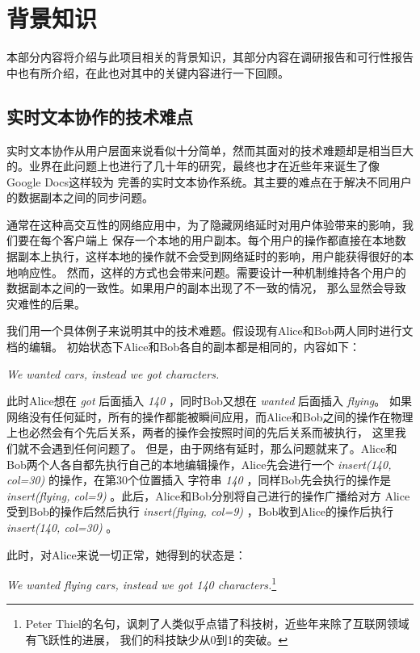 \documentclass[11pt]{ctexart}
\begin{document}
\section{背景知识}
本部分内容将介绍与此项目相关的背景知识，其部分内容在调研报告和可行性报告中也有所介绍，在此也对其中的关键内容进行一下回顾。
\subsection{实时文本协作的技术难点}
实时文本协作从用户层面来说看似十分简单，然而其面对的技术难题却是相当巨大的。业界在此问题上也进行了几十年的研究，最终也才在近些年来诞生了像Google Docs这样较为
完善的实时文本协作系统。其主要的难点在于解决不同用户的数据副本之间的同步问题。  

通常在这种高交互性的网络应用中，为了隐藏网络延时对用户体验带来的影响，我们要在每个客户端上
保存一个本地的用户副本。每个用户的操作都直接在本地数据副本上执行，这样本地的操作就不会受到网络延时的影响，用户能获得很好的本地响应性。
然而，这样的方式也会带来问题。需要设计一种机制维持各个用户的数据副本之间的一致性。如果用户的副本出现了不一致的情况，
那么显然会导致灾难性的后果。

我们用一个具体例子来说明其中的技术难题。假设现有Alice和Bob两人同时进行文档的编辑。
初始状态下Alice和Bob各自的副本都是相同的，内容如下：
\begin{center}
\textit{We wanted cars, instead we got characters.}
\end{center}

此时Alice想在 \textit{got} 后面插入 \textit{140} ，同时Bob又想在 \textit{wanted} 后面插入 \textit{flying}。
如果网络没有任何延时，所有的操作都能被瞬间应用，而Alice和Bob之间的操作在物理上也必然会有个先后关系，两者的操作会按照时间的先后关系而被执行，
这里我们就不会遇到任何问题了。
但是，由于网络有延时，那么问题就来了。Alice和Bob两个人各自都先执行自己的本地编辑操作，Alice先会进行一个 \textit{insert(140, col=30)} 的操作，在第30个位置插入
字符串 \textit{140} ，同样Bob先会执行的操作是 \textit{insert(flying, col=9)} 。此后，Alice和Bob分别将自己进行的操作广播给对方
Alice受到Bob的操作后然后执行 \textit{insert(flying, col=9)} ，Bob收到Alice的操作后执行 \textit{insert(140, col=30)} 。

此时，对Alice来说一切正常，她得到的状态是：
\begin{center}
    \textit{We wanted flying cars, instead we got 140 characters.}\footnote{Peter Thiel的名句，讽刺了人类似乎点错了科技树，近些年来除了互联网领域有飞跃性的进展，
    我们的科技缺少从0到1的突破。}
\end{center}
\end{document}
